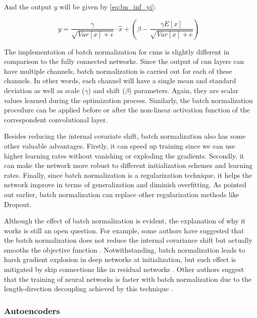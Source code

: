 And the output $y$ will be given by \autoref{eq:bn_inf_yi}:

\begin{equation}
\label{eq:bn_inf_yi}
y = \frac{\gamma}{\sqrt{Var[x] + \epsilon}} \cdot \hat{x} + \left( \beta - \frac{\gamma E[x]}{\sqrt{Var[x] + e}} \right)
\end{equation}

The implementation of batch normalization for \aclp{cnn} is slightly different in comparison to the fully connected networks. Since the output of \acs{cnn} layers can have multiple channels, batch normalization is carried out for each of these channels. In other words, each channel will have a single mean and standard deviation as well as scale ($\gamma$) and shift ($\beta$) parameters. Again, they are scalar values learned during the optimization process. Similarly, the batch normalization procedure can be applied before or after the non-linear activation function of the correspondent convolutional layer.

Besides reducing the internal covariate shift, batch normalization also has some other valuable advantages. Firstly, it can speed up training since we can use higher learning rates without vanishing or exploding the gradients. Secondly, it can make the network more robust to different initialization schemes and learning rates. Finally, since batch normalization is a regularization technique, it helps the network improve in terms of generalization and diminish overfitting. As pointed out earlier, batch normalization can replace other regularization methods like Dropout.

Although the effect of batch normalization is evident, the explanation of why it works is still an open question. For example, some authors have suggested that the batch normalization does not reduce the internal covariance shift but actually smooths the objective function \citep{santurkar2018does}. Notwithstanding, batch normalization leads to harsh gradient explosion in deep networks at initialization, but such effect is mitigated by skip connections like in residual networks \citep{yang2019mean}. Other authors suggest that the training of neural networks is faster with batch normalization due to the length-direction decoupling achieved by this technique \citep{kohler2019exponential}.

\subsubsection{Autoencoders}

